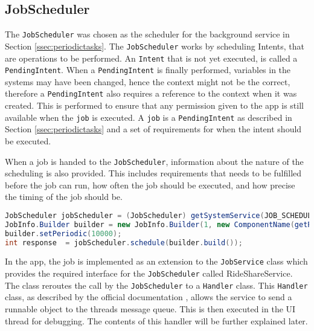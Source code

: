 \subsection{JobScheduler}
The \texttt{JobScheduler} was chosen as the scheduler for the background service in Section \ref{ssec:periodictasks}.
The \texttt{JobScheduler} works by scheduling Intents, that are operations to be performed. %
An \texttt{Intent} that is not yet executed, is called a \texttt{PendingIntent}.
When a \texttt{PendingIntent} is finally performed, variables in the systems may have been changed, hence the context might not be the correct, therefore a \texttt{PendingIntent} also requires a reference to the context when it was created.
This is performed to ensure that any permission given to the app is still available when the \texttt{job} is executed.
A \texttt{job} is a \texttt{PendingIntent} as described in Section \ref{ssec:periodictasks} and a set of requirements for when the intent should be executed.

When a job is handed to the \texttt{JobScheduler}, information about the nature of the scheduling is also provided.
This includes requirements that needs to be fulfilled before the job can run, how often the job should be executed, and how precise the timing of the job should be.


\begin{lstlisting}[language=Java]
JobScheduler jobScheduler = (JobScheduler) getSystemService(JOB_SCHEDULER_SERVICE);
JobInfo.Builder builder = new JobInfo.Builder(1, new ComponentName(getPackageName(), RideShareService.class.getName()));
builder.setPeriodic(10000);
int response  = jobScheduler.schedule(builder.build());	
\end{lstlisting}

In the app, the job is implemented as an extension to the \texttt{JobService} class which provides the required interface for the \texttt{JobScheduler} called RideShareService.
The class reroutes the call by the \texttt{JobScheduler} to a \texttt{Handler} class.
This \texttt{Handler} class, as described by the official documentation \cite{handler}, allows the service to send a runnable object to the threads message queue.
This is then executed in the UI thread for debugging.
The contents of this handler will be further explained later. 



